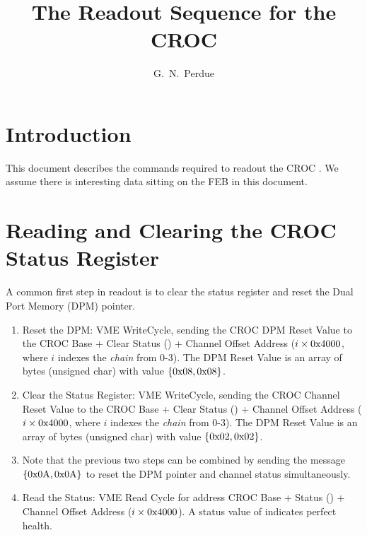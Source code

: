 




\linenumbers

\title{The Readout Sequence for the \minerva CROC}

\author[1]{G.~N.~Perdue}
\affil[1]{\Rochester}

\maketitle


\section{Introduction}
\label{sec:introduction}

This document describes the commands required to readout the \minerva CROC \cite{refcroc}.
We assume there is interesting data sitting on the FEB in this document.

\section{Reading and Clearing the CROC Status Register}
\label{sec:readandclearcrocstatus}

A common first step in readout is to clear the status register and reset the Dual Port Memory (DPM) pointer.

\begin{enumerate}
\item Reset the DPM: VME WriteCycle, sending the CROC DPM Reset Value to the CROC Base + Clear Status () + Channel Offset Address ($i \times \text{0x4000}$, where $i$ indexes the \emph{chain} from 0-3). The DPM Reset Value is an array of bytes (unsigned char) with value $\left\{\text{0x08},\text{0x08}\right\}$. 
\item Clear the Status Register: VME WriteCycle, sending the CROC Channel Reset Value to the CROC Base + Clear Status () + Channel Offset Address ($i \times \text{0x4000}$, where $i$ indexes the \emph{chain} from 0-3). The DPM Reset Value is an array of bytes (unsigned char) with value $\left\{\text{0x02},\text{0x02}\right\}$. 
\item Note that the previous two steps can be combined by sending the message $\left\{\text{0x0A},\text{0x0A}\right\}$ to reset the DPM pointer and channel status simultaneously.
\item Read the Status: VME Read Cycle for address CROC Base + Status () + Channel Offset Address ($i \times \text{0x4000}$). A status value of  indicates perfect health.
\end{enumerate}


